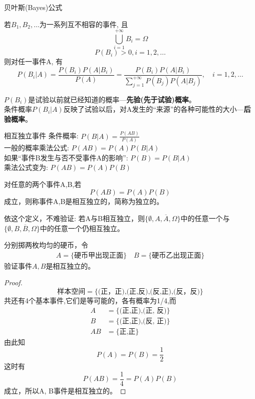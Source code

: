 \begin{frame}{贝叶斯(Bayes)公式}
\begin{theorem}
	若$B_1, B_2, \dots$为一系列互不相容的事件, 且
	\[\bigcup\limits_{i=1}^{+\infty}B_i=\Omega \]
	\[P(B_i)>0, i=1,2,\dots \]
	则对任一事件A, 有
	\[P(B_i|A)=\frac{P(B_i)P(A|B_i)}{P(A)}=\frac{P(B_i)P(A|B_i)}{\sum\limits_{j=1}^{+\infty}P(B_j)P(A|B_j)}, \quad i=1,2,\dots \]
\end{theorem}
$P(B_i)$是试验以前就已经知道的概率---\textbf{先验(先于试验)概率}。\\
条件概率$P(B_i|A)$反映了试验以后，对A发生的``来源''的各种可能性的大小---\textbf{后验概率}。
\end{frame}

\begin{frame}{相互独立事件}
条件概率: $P(B|A)=\frac{P(AB)}{P(A)}$\\
一般的概率乘法公式: $P(AB)=P(A)P(B|A)$\\
如果``事件B发生与否不受事件A的影响'': $P(B)=P(B|A)$\\
乘法公式变为: $P(AB)=P(A)P(B)$
\begin{definition}
对任意的两个事件A,B,若
\[P(AB)=P(A)P(B)\]
成立，则称事件A,B是相互独立的，简称为独立的。	
\end{definition}
\begin{block}{依这个定义，不难验证:}
	若A与B相互独立，则$\{\emptyset,A,\overline{A},\Omega\}$中的任意一个与$\{\emptyset,B,\overline{B},\Omega\}$中的任意一个仍相互独立。
\end{block}
\end{frame}

\begin{frame}[shrink]
		分别掷两枚均匀的硬币，令
		\begin{align*}
		A=\{\text{硬币甲出现正面} \}\quad	B=\{\text{硬币乙出现正面} \}
		\end{align*}
		验证事件$A,B$是相互独立的。
 \begin{proof}
			$$\text{样本空间}=\{\text{(正，正),(正,反),(反,正),(反，反)}\} $$
			共还有4个基本事件,它们是等可能的，各有概率为1/4,而\\
			\begin{align*}
			A&=\{\text{(正,正),(正, 反)}\} \\
			B&=\{\text{(正,正),(反, 正)}\} \\
			AB&=\{\text{正,正}\}
			\end{align*}
			由此知 \[P(A)=P(B)=\frac{1}{2}\]
			这时有 \[P(AB)=\frac{1}{4}=P(A)P(B)\]
			成立，所以A, B事件是相互独立的。
 \end{proof}
\end{frame}

